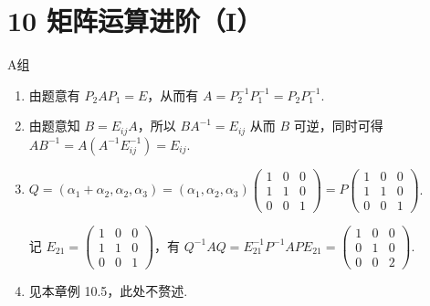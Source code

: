 \section*{10 矩阵运算进阶（I）}

\vspace{2ex}

\centerline{\heiti A组}
\begin{enumerate}
    \item 由题意有 $P_2AP_1 = E$，从而有 $A=P_2^{-1}P_1^{-1}=P_2P_1^{-1}$.

    \item 由题意知 $B = E_{ij}A$，所以 $BA^{-1}=E_{ij}$ 从而 $B$ 可逆，同时可得 $AB^{-1}=A(A^{-1}E_{ij}^{-1})=E_{ij}$.

    \item $Q = (\alpha_1+\alpha_2,\alpha_2,\alpha_3)=(\alpha_1,\alpha_2,\alpha_3)\begin{pmatrix}1 & 0 & 0 \\ 1 & 1 & 0 \\ 0 & 0 & 1\end{pmatrix}=P\begin{pmatrix}1 & 0 & 0 \\ 1 & 1 & 0 \\ 0 & 0 & 1\end{pmatrix}$.

          记 $E_{21}=\begin{pmatrix}1 & 0 & 0 \\ 1 & 1 & 0 \\ 0 & 0 & 1\end{pmatrix}$，有 $Q^{-1}AQ=E_{21}^{-1}P^{-1}APE_{21}=\begin{pmatrix}1 & 0 & 0 \\ 0 & 1 & 0 \\ 0 & 0 & 2\end{pmatrix}$.

    \item 见本章例 10.5，此处不赘述.
\end{enumerate}

